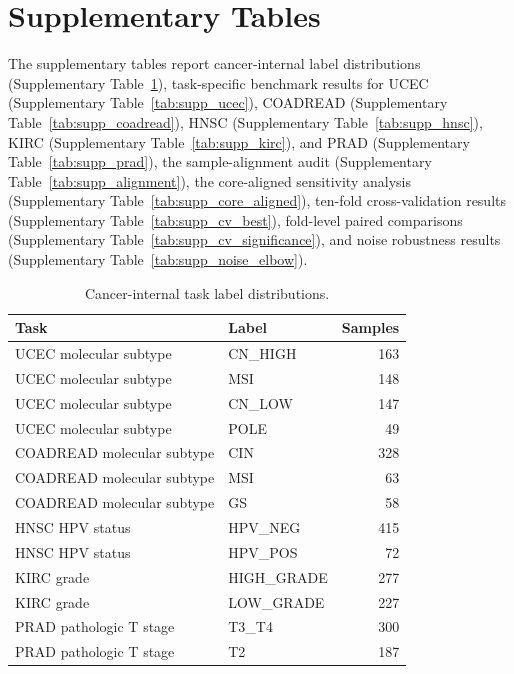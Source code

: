 \section{Supplementary Tables}

\setcounter{table}{0}
\renewcommand{\thetable}{S\arabic{table}}

The supplementary tables report cancer-internal label distributions (Supplementary Table~\ref{tab:supp_label_counts}), task-specific benchmark results for UCEC (Supplementary Table~\ref{tab:supp_ucec}), COADREAD (Supplementary Table~\ref{tab:supp_coadread}), HNSC (Supplementary Table~\ref{tab:supp_hnsc}), KIRC (Supplementary Table~\ref{tab:supp_kirc}), and PRAD (Supplementary Table~\ref{tab:supp_prad}), the sample-alignment audit (Supplementary Table~\ref{tab:supp_alignment}), the core-aligned sensitivity analysis (Supplementary Table~\ref{tab:supp_core_aligned}), ten-fold cross-validation results (Supplementary Table~\ref{tab:supp_cv_best}), fold-level paired comparisons (Supplementary Table~\ref{tab:supp_cv_significance}), and noise robustness results (Supplementary Table~\ref{tab:supp_noise_elbow}).

\begin{table}[ht]
\centering
\caption{Cancer-internal task label distributions.}
\begin{tabular}{llr}
\toprule
Task & Label & Samples \\
\midrule
UCEC molecular subtype & CN\_HIGH & 163 \\
UCEC molecular subtype & MSI & 148 \\
UCEC molecular subtype & CN\_LOW & 147 \\
UCEC molecular subtype & POLE & 49 \\
COADREAD molecular subtype & CIN & 328 \\
COADREAD molecular subtype & MSI & 63 \\
COADREAD molecular subtype & GS & 58 \\
HNSC HPV status & HPV\_NEG & 415 \\
HNSC HPV status & HPV\_POS & 72 \\
KIRC grade & HIGH\_GRADE & 277 \\
KIRC grade & LOW\_GRADE & 227 \\
PRAD pathologic T stage & T3\_T4 & 300 \\
PRAD pathologic T stage & T2 & 187 \\
\bottomrule
\end{tabular}
\label{tab:supp_label_counts}
\end{table}

